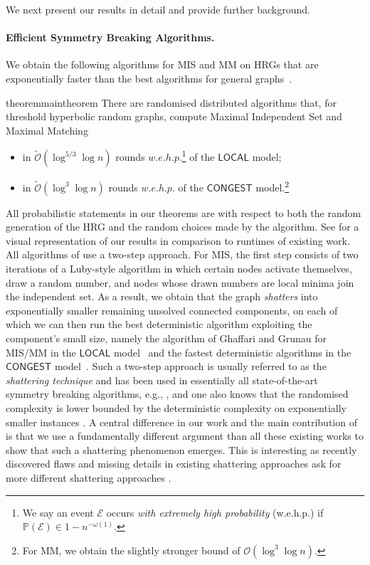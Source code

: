 \documentclass[letterpaper,11pt]{article}
\newcommand{\Pro}[1]{\mathbb{P}\left(#1\right)}
\newcommand{\wehp}{w.e.h.p.\xspace}
\newcommand{\1}{\mathbb I}
\newcommand{\bigO}{\mathcal{O}}
\newcommand{\CONGEST}{\ensuremath{\mathsf{CONGEST}}\xspace}
\newcommand{\LOCAL}{\ensuremath{\mathsf{LOCAL}}\xspace}
\begin{document}
We next present our results in detail and provide further background. 

\paragraph{Efficient Symmetry Breaking Algorithms.} 
We obtain the following algorithms for MIS and MM on HRGs that are exponentially faster than the best algorithms for general graphs~\cite{luby86,ghaffari-soda-16,BEPS}. 
\begin{restatable}{theorem}{maintheorem}
\label{thm:mainpolylog}
    There are randomised distributed algorithms that, for threshold hyperbolic random graphs, compute Maximal Independent Set and Maximal Matching
%
    \begin{itemize}
        \item in $\tilde{\bigO}(\log^{5/3} \log n)$ rounds $\wehp$\footnote{We say an event $\mathcal{E}$ occurs \emph{with extremely high probability} (\wehp) if $\Pro{\mathcal{E}} \in 1 - n^{-\omega(1)}$.} of the \LOCAL model;
        \item  in $\tilde{\bigO}(\log^{3} \log n)$ rounds $\wehp$ of the \CONGEST model.\footnote{For MM, we obtain the slightly stronger bound of $\bigO(\log^3\log n)$.}
    \end{itemize}
\end{restatable}
All probabilistic statements in our theorems are with respect to both the random generation of the HRG and the random choices made by the algorithm.
See  for a visual representation of our results in comparison to runtimes of existing work.
All algorithms of  use a two-step approach. For MIS, the first step consists of two iterations of a Luby-style algorithm in which certain nodes activate themselves, draw a random number, and nodes whose drawn numbers are local minima join the independent set. As a result, we obtain that the graph \emph{shatters} into exponentially smaller remaining unsolved connected components, on each of which we can then run the best deterministic algorithm exploiting the component's small size, namely the algorithm of Ghaffari and Grunau for MIS/MM in the \LOCAL model~\cite{GG24} and the fastest deterministic algorithms in the \CONGEST model~\cite{fggkr-soda-23}. Such a two-step approach is usually referred to as the \emph{shattering technique} and has been used in essentially all state-of-the-art symmetry breaking algorithms, e.g., \cite{BEPS,ghaffari-soda-16,CLP18}, and one also knows that the randomised complexity is lower bounded by the deterministic complexity on exponentially smaller instances \cite{CKP19}. A central difference in our work and the main contribution of   is that we use a fundamentally different argument than all these existing works to show that such a shattering phenomenon emerges. This is interesting as recently discovered flaws and missing details in existing shattering approaches ask for more different shattering approaches \cite{GHMN26}.
\end{document}
